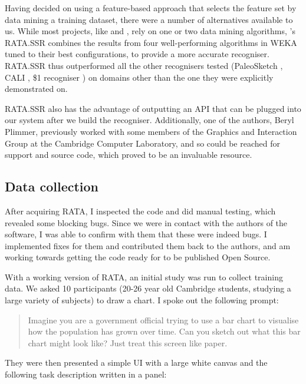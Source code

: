 	Having decided on using a feature-based approach that selects the feature set by data mining a training dataset, there were a number of alternatives available to us. While most projects, like \citep{rubine_specifying_1991} and \citep{willems_iconic_2009}, rely on one or two data mining algorithms, \citep{chang_rata._2010}'s RATA.SSR combines the results from four well-performing algorithms in WEKA \citep{hall_weka_2009} tuned to their best configurations, to provide a more accurate recogniser. RATA.SSR thus outperformed all the other recognisers tested (PaleoSketch \citep{paulson_paleosketch:_2008}, CALI \citep{fonseca_cali:_2002}, \$1 recogniser \citep{wobbrock_gestures_2007}) on domains other than the one they were explicitly demonstrated on. 
	
	RATA.SSR also has the advantage of outputting an API that can be plugged into our system after we build the recogniser. Additionally, one of the authors, Beryl Plimmer, previously worked with some members of the Graphics and Interaction Group at the Cambridge Computer Laboratory, and so could be reached for support and source code, which proved to be an invaluable resource.
	
	\subsection{Data collection}
	After acquiring RATA, I inspected the code and did manual testing, which revealed some blocking bugs. Since we were in contact with the authors of the software, I was able to confirm with them that these were indeed bugs. I implemented fixes for them and contributed them back to the authors, and am working towards getting the code ready for to be published Open Source.
	
	With a working version of RATA, an initial study was run to collect training data. We asked 10 participants (20-26 year old Cambridge students, studying a large variety of subjects) to draw a chart. I spoke out the following prompt:
	
	\begin{quotation}
	Imagine you are a government official trying to use a bar chart to visualise how the population has grown over time. Can you sketch out what this bar chart might look like? Just treat this screen like paper.
	\end{quotation}
	
	 They were then presented a simple UI with a large white canvas and the following task description written in a panel:
	
